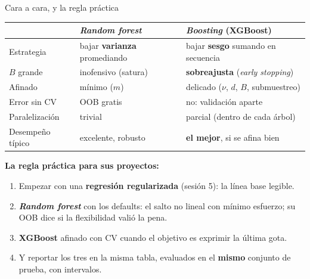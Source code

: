 \documentclass{beamer}
\newcommand{\1}{\mathbb{I}}
\begin{document}
\begin{frame}{Cara a cara, y la regla práctica}
\small
\begin{center}
\footnotesize
\setlength{\tabcolsep}{4pt}
\begin{tabular}{lll}
\hline
 & \emph{Random forest} & \emph{Boosting} (XGBoost) \\
\hline
Estrategia & bajar \textbf{varianza} promediando & bajar \textbf{sesgo} sumando en secuencia \\
$B$ grande & inofensivo (satura) & \textbf{sobreajusta} (\emph{early stopping}) \\
Afinado & mínimo ($m$) & delicado ($\nu$, $d$, $B$, submuestreo) \\
Error sin CV & OOB gratis & no: validación aparte \\
Paralelización & trivial & parcial (dentro de cada árbol) \\
Desempeño típico & excelente, robusto & \textbf{el mejor}, si se afina bien \\
\hline
\end{tabular}
\end{center}
\pause
\vspace{0.15cm}
\textbf{La regla práctica para sus proyectos:}
\begin{enumerate}\itemsep3pt
  \item Empezar con una \textbf{regresión regularizada} (sesión 5): la línea base legible.
  \item \textbf{\emph{Random forest}} con los defaults: el salto no lineal con mínimo esfuerzo; su OOB dice si la flexibilidad valió la pena.
  \item \textbf{XGBoost} afinado con CV cuando el objetivo es exprimir la última gota.
  \item Y reportar los tres en la misma tabla, evaluados en el \textbf{mismo} conjunto de prueba, con intervalos.
\end{enumerate}
\end{frame}
\end{document}
